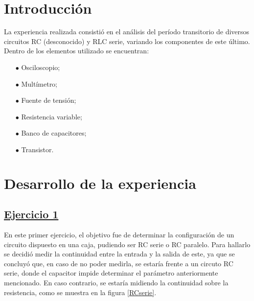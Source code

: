 \documentclass[a4paper]{article}
\begin{document}




\section*{Introducción}
La experiencia realizada consistió en el análisis del período transitorio de diversos circuitos RC (desconocido) y RLC serie, variando los componentes de este último. Dentro de los elementos utilizado se encuentran:
	\begin{itemize}
	\item[$\bullet$]	Osciloscopio;
	\item[$\bullet$]	Multímetro;
	\item[$\bullet$]	Fuente de tensión;
	\item[$\bullet$]	Resistencia variable;
	\item[$\bullet$]	Banco de capacitores;
	\item[$\bullet$]	Transistor.
	\end{itemize}	  

\section*{Desarrollo de la experiencia}

\subsection*{\underline{Ejercicio 1}}


En este primer ejercicio, el objetivo fue de determinar la configuración de un circuito dispuesto en una caja, pudiendo ser RC serie o RC paralelo. Para hallarlo se decidió medir la continuidad entre la entrada y la salida de este, ya que se concluyó que, en caso de no poder medirla, se estaría frente a un circuto RC serie, donde el capacitor impide determinar el parámetro anteriormente mencionado. En caso contrario, se estaría midiendo la continuidad sobre la resistencia, como se muestra en la figura \ref{RCserie}.
\end{document}
